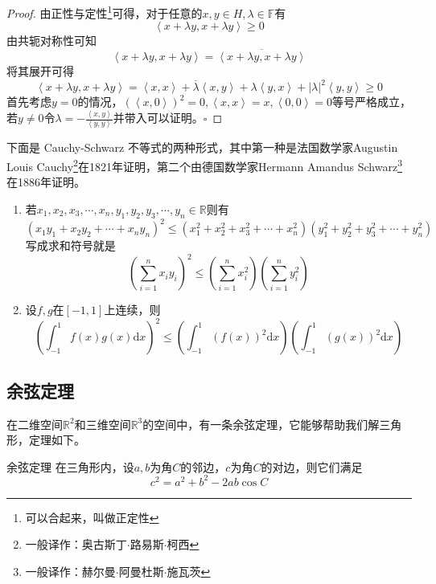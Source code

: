 \begin{proof}
	由正性与定性\footnote{可以合起来，叫做正定性}可得，对于任意的$x,y\in H,\lambda \in \mathbb{F}$有$$\left \langle x+\lambda y,x+\lambda y \right \rangle \ge 0$$由共轭对称性可知$$\left \langle x+\lambda y,x+\lambda y \right \rangle=\overline{\left \langle x+\lambda y,x+\lambda y \right \rangle}$$将其展开可得$$\left \langle x+\lambda y,x+\lambda y \right \rangle =\left \langle x,x \right \rangle +\overline{\lambda} \left \langle x,y \right \rangle +\lambda \left \langle y,x \right \rangle+\left | \lambda \right |^2\left \langle y,y \right \rangle \ge 0$$首先考虑$y=0$的情况，$(\left \langle x,0 \right \rangle )^2=0,\left \langle x,x \right \rangle =x,\left \langle 0,0 \right \rangle =0$等号严格成立，若$y\neq 0$令$\displaystyle \lambda =-\frac{\left \langle x,y \right \rangle }{\left \langle y,y \right \rangle }$并带入可以证明。$\square$
\end{proof}

下面是 Cauchy-Schwarz 不等式的两种形式，其中第一种是法国数学家Augustin Louis Cauchy\footnote{一般译作：奥古斯丁$\cdot$路易斯$\cdot$柯西}在1821年证明，第二个由德国数学家Hermann Amandus Schwarz\footnote{一般译作：赫尔曼$\cdot$阿曼杜斯$\cdot$施瓦茨}在1886年证明。

\begin{corollary}
	\begin{enumerate}
		\item 若$x_1,x_2,x_3,\cdots,x_n,y_1,y_2,y_3,\cdots,y_n\in \mathbb{R}$则有$$\left( x_1y_1+x_2y_2+\cdots+x_ny_n \right)^2\le \left( x_1^2+x_2^2+x_3^2+\cdots+x_n^2 \right)\left( y_1^2+y_2^2+y_3^2+\cdots+y_n^2 \right)$$写成求和符号就是$$\left ( \sum_{i=1}^{n}x_iy_i  \right ) ^2\le \left ( \sum_{i=1}^{n}x_i^2  \right ) \left ( \sum_{i=1}^{n}y_i^2  \right ) $$
		\item 设$f,g$在$\left [ -1,1 \right ] $上连续，则$$\left ( \int_{-1}^{1}f(x)g(x)\mathrm{d}x \right )  ^2\le \left ( \int_{-1}^{1}\left ( f(x) \right )^2 \mathrm{d}x \right ) \left ( \int_{-1}^{1}\left ( g(x) \right )^2 \mathrm{d}x \right ) $$
	\end{enumerate}
\end{corollary}

\subsection{余弦定理}

在二维空间$\mathbb{R}^2$和三维空间$\mathbb{R}^3$的空间中，有一条余弦定理，它能够帮助我们解三角形，定理如下。
\begin{theorem}{余弦定理}
	在三角形内，设$a,b$为角$C$的邻边，$c$为角$C$的对边，则它们满足$$c^2=a^2+b^2-2ab\cos C$$
\end{theorem}

